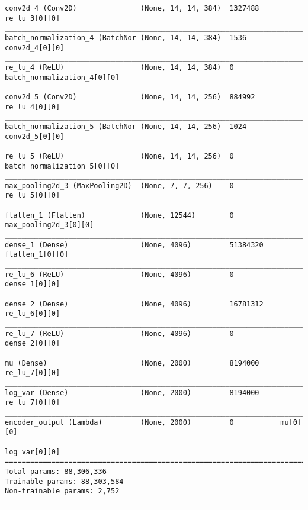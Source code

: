 \begin{lstlisting}[caption={AlexNet-VAE Encoder},captionpos=b,basicstyle=\tiny, label={lst:alexnet-vae-encoder}]
conv2d_4 (Conv2D)               (None, 14, 14, 384)  1327488     re_lu_3[0][0]
__________________________________________________________________________________________________
batch_normalization_4 (BatchNor (None, 14, 14, 384)  1536        conv2d_4[0][0]
__________________________________________________________________________________________________
re_lu_4 (ReLU)                  (None, 14, 14, 384)  0           batch_normalization_4[0][0]
__________________________________________________________________________________________________
conv2d_5 (Conv2D)               (None, 14, 14, 256)  884992      re_lu_4[0][0]
__________________________________________________________________________________________________
batch_normalization_5 (BatchNor (None, 14, 14, 256)  1024        conv2d_5[0][0]
__________________________________________________________________________________________________
re_lu_5 (ReLU)                  (None, 14, 14, 256)  0           batch_normalization_5[0][0]
__________________________________________________________________________________________________
max_pooling2d_3 (MaxPooling2D)  (None, 7, 7, 256)    0           re_lu_5[0][0]
__________________________________________________________________________________________________
flatten_1 (Flatten)             (None, 12544)        0           max_pooling2d_3[0][0]
__________________________________________________________________________________________________
dense_1 (Dense)                 (None, 4096)         51384320    flatten_1[0][0]
__________________________________________________________________________________________________
re_lu_6 (ReLU)                  (None, 4096)         0           dense_1[0][0]
__________________________________________________________________________________________________
dense_2 (Dense)                 (None, 4096)         16781312    re_lu_6[0][0]
__________________________________________________________________________________________________
re_lu_7 (ReLU)                  (None, 4096)         0           dense_2[0][0]
__________________________________________________________________________________________________
mu (Dense)                      (None, 2000)         8194000     re_lu_7[0][0]
__________________________________________________________________________________________________
log_var (Dense)                 (None, 2000)         8194000     re_lu_7[0][0]
__________________________________________________________________________________________________
encoder_output (Lambda)         (None, 2000)         0           mu[0][0]
                                                                 log_var[0][0]
==================================================================================================
Total params: 88,306,336
Trainable params: 88,303,584
Non-trainable params: 2,752
__________________________________________________________________________________________________
\end{lstlisting}